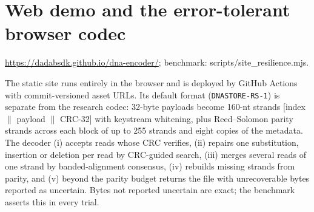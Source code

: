 \documentclass[11pt,a4paper]{article}
\newcommand{\pageheading}[2]{\clearpage\section{#1}{\color{muted}\small #2}\par\vspace{5pt}}
\begin{document}
\pageheading{Web demo and the error-tolerant browser codec}{\url{https://dadabsdk.github.io/dna-encoder/}; benchmark: scripts/site\_resilience.mjs.}
The static site runs entirely in the browser and is deployed by GitHub Actions with
commit-versioned asset URLs. Its default format (\texttt{DNASTORE-RS-1}) is separate from
the research codec: 32-byte payloads become 160-nt strands
[index $\|$ payload $\|$ CRC-32] with keystream whitening, plus Reed--Solomon parity
strands across each block of up to 255 strands and eight copies of the metadata. The
decoder (i) accepts reads whose CRC verifies, (ii) repairs one substitution, insertion or
deletion per read by CRC-guided search, (iii) merges several reads of one strand by
banded-alignment consensus, (iv) rebuilds missing strands from parity, and (v) beyond the
parity budget returns the file with unrecoverable bytes reported as uncertain. Bytes not
reported uncertain are exact; the benchmark asserts this in every trial.
\end{document}
